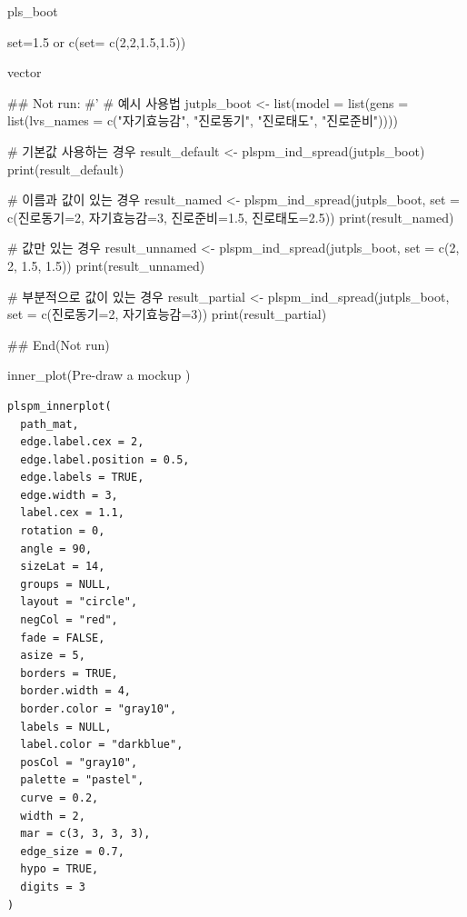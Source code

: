 \documentclass[a4paper]{book}
\begin{document}
%
\begin{Arguments}
\begin{ldescription}
\item[\code{pls\_boot}] pls\_boot

\item[\code{set}] set=1.5 or c(set= c(2,2,1.5,1.5))
\end{ldescription}
\end{Arguments}
%
\begin{Value}
vector
\end{Value}
%
\begin{Examples}
\begin{ExampleCode}

## Not run: 
#'
# 예시 사용법
jutpls_boot <- list(model = list(gens = list(lvs_names = c("자기효능감", "진로동기", "진로태도", "진로준비"))))

# 기본값 사용하는 경우
result_default <- plspm_ind_spread(jutpls_boot)
print(result_default)

# 이름과 값이 있는 경우
result_named <- plspm_ind_spread(jutpls_boot, set = c(진로동기=2, 자기효능감=3, 진로준비=1.5, 진로태도=2.5))
print(result_named)

# 값만 있는 경우
result_unnamed <- plspm_ind_spread(jutpls_boot, set = c(2, 2, 1.5, 1.5))
print(result_unnamed)

# 부분적으로 값이 있는 경우
result_partial <- plspm_ind_spread(jutpls_boot, set = c(진로동기=2, 자기효능감=3))
print(result_partial)


## End(Not run)



\end{ExampleCode}
\end{Examples}
%
\begin{Description}
inner\_plot(Pre-draw a mockup )
\end{Description}
%
\begin{Usage}
\begin{verbatim}
plspm_innerplot(
  path_mat,
  edge.label.cex = 2,
  edge.label.position = 0.5,
  edge.labels = TRUE,
  edge.width = 3,
  label.cex = 1.1,
  rotation = 0,
  angle = 90,
  sizeLat = 14,
  groups = NULL,
  layout = "circle",
  negCol = "red",
  fade = FALSE,
  asize = 5,
  borders = TRUE,
  border.width = 4,
  border.color = "gray10",
  labels = NULL,
  label.color = "darkblue",
  posCol = "gray10",
  palette = "pastel",
  curve = 0.2,
  width = 2,
  mar = c(3, 3, 3, 3),
  edge_size = 0.7,
  hypo = TRUE,
  digits = 3
)
\end{verbatim}
\end{Usage}
\end{document}

